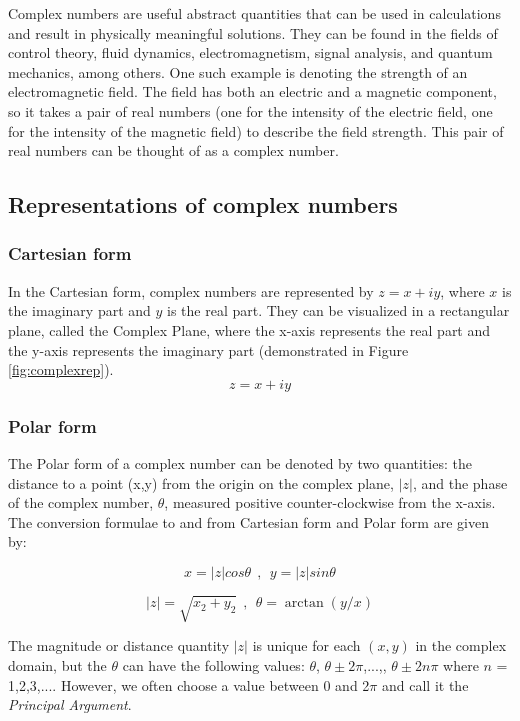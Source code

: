 Complex numbers are useful abstract quantities that can be used in calculations and result in physically meaningful solutions. They can be found in the fields of control theory, fluid dynamics, electromagnetism, signal analysis, and quantum mechanics, among others.
One such example is denoting the strength of an electromagnetic field. The field has both an electric and a magnetic component, so it takes a pair of real numbers (one for the intensity of the electric field, one for the intensity of the magnetic field) to describe the field strength. This pair of real numbers can be thought of as a complex number.  

\subsection{Representations of complex numbers}

\subsubsection{Cartesian form}
In the Cartesian form, complex numbers are represented by $z=x+iy$, where $x$ is the imaginary part and $y$ is the real part. They can be visualized in a rectangular plane, called the Complex Plane, where the x-axis represents the real part and the y-axis represents the imaginary part (demonstrated in Figure \ref{fig:complexrep}). 
\begin{equation}
z = x+iy 
\end{equation}
\subsubsection{Polar form}
The Polar form of a complex number can be denoted by two quantities: 
the distance to a point (x,y) from the origin on the complex plane, $|z|$, and the phase of the complex number, $\theta$, measured positive counter-clockwise from the x-axis. The conversion formulae to and from Cartesian form and Polar form are given by:





\begin{equation}
x = |z|cos\theta  ~~,~~ y = |z|sin\theta 
\end{equation}

\begin{equation}
|z| = \sqrt{x_{2}+y_{2}}  ~~,~~ \theta = \arctan(y/x) 
\end{equation}

The magnitude or distance quantity $|z|$ is unique for each $(x,y)$ in the complex domain, but the $\theta$ can have the following values: $\theta$, $\theta \pm \mathrm{2}\pi$,...,, $\theta \pm \mathrm{2}n\pi$ where $n$ = 1,2,3,.... However, we often choose a value between $0$ and 2$\pi$ and call it the \textit{Principal Argument}.

